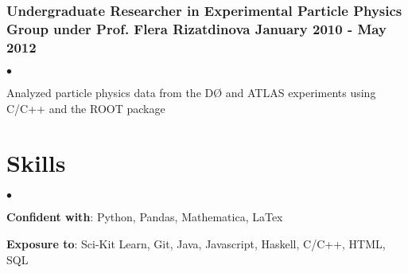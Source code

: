 \documentclass[letterpaper]{article}
\renewenvironment{itemize}{
  \begin{list}{$\bullet$}{
    \setlength{\itemsep}{0em}
    \setlength{\parskip}{0em}
    \setlength{\parsep}{0em} 
    \setlength{\topsep}{0em} 
  }
}{
  \end{list}
}
\begin{document}
\subsubsection*{Undergraduate Researcher in Experimental Particle Physics Group under Prof. Flera Rizatdinova \hfill January 2010 - May 2012}
    \begin{itemize}
        \item Analyzed particle physics data from the DØ and ATLAS experiments using C/C++ and the ROOT package
    \end{itemize}

\section*{Skills}

\begin{itemize}

\item \textbf{Confident with}: Python, Pandas, Mathematica, LaTex%

\item \textbf{Exposure to}: Sci-Kit Learn, Git, Java, Javascript, Haskell, C/C++, HTML, SQL%

\end{itemize}


\end{document}
